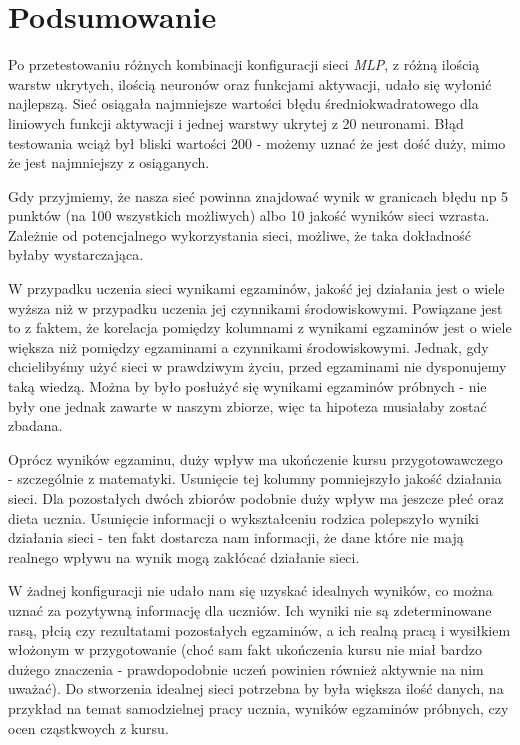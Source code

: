\documentclass[12pt]{article}
\begin{document}
\pagebreak
\section{Podsumowanie}
Po przetestowaniu różnych kombinacji konfiguracji sieci \textit{MLP}, z różną ilością warstw ukrytych, ilością neuronów oraz funkcjami aktywacji, udało się wyłonić najlepszą. Sieć osiągała najmniejsze wartości błędu średniokwadratowego dla liniowych funkcji aktywacji i jednej warstwy ukrytej z 20 neuronami. Błąd testowania wciąż był bliski wartości 200 - możemy uznać że jest dość duży, mimo że jest najmniejszy z osiąganych. 

Gdy przyjmiemy, że nasza sieć powinna znajdować wynik w granicach błędu np 5 punktów (na 100 wszystkich możliwych) albo 10 jakość wyników sieci wzrasta. Zależnie od potencjalnego wykorzystania sieci, możliwe, że taka dokładność byłaby wystarczająca.

W przypadku uczenia sieci wynikami egzaminów, jakość jej działania jest o wiele wyższa niż w przypadku uczenia jej czynnikami środowiskowymi. Powiązane jest to z faktem, że korelacja pomiędzy kolumnami z wynikami egzaminów jest o wiele większa niż pomiędzy egzaminami a czynnikami środowiskowymi. Jednak, gdy chcielibyśmy użyć sieci w prawdziwym życiu, przed egzaminami nie dysponujemy taką wiedzą. Można by było posłużyć się wynikami egzaminów próbnych -  nie były one jednak zawarte w naszym zbiorze, więc ta hipoteza musiałaby zostać zbadana.

Oprócz wyników egzaminu, duży wpływ ma ukończenie kursu przygotowawczego - szczególnie z matematyki. Usunięcie tej kolumny pomniejszyło jakość działania sieci. Dla pozostałych dwóch zbiorów podobnie duży wpływ ma jeszcze płeć oraz dieta ucznia. Usunięcie informacji o wykształceniu rodzica polepszyło wyniki działania sieci - ten fakt dostarcza nam informacji, że dane które nie mają realnego wpływu na wynik mogą zakłócać działanie sieci.

W żadnej konfiguracji nie udało nam się uzyskać idealnych wyników, co można uznać za pozytywną informację dla uczniów. Ich wyniki nie są zdeterminowane rasą, płcią czy rezultatami pozostałych egzaminów, a ich realną pracą i wysiłkiem włożonym w przygotowanie (choć sam fakt ukończenia kursu nie miał bardzo dużego znaczenia - prawdopodobnie uczeń powinien również aktywnie na nim uważać). Do stworzenia idealnej sieci potrzebna by była większa ilość danych, na przykład na temat samodzielnej pracy ucznia, wyników egzaminów próbnych, czy ocen cząstkwoych z kursu. 
\end{document}
